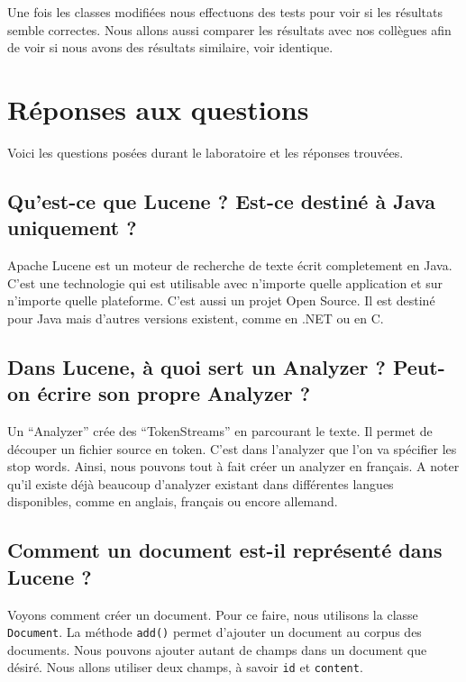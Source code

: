 \documentclass[a4paper, 11pt]{article}
\begin{document}
{Une fois les classes modifiées nous effectuons des tests pour voir si les résultats semble correctes. Nous allons aussi comparer les résultats avec nos collègues afin de voir si nous avons des résultats similaire, voir identique.

\section{Réponses aux questions} 

Voici les questions posées durant le laboratoire et les réponses trouvées. 

\subsection{Qu’est-ce que Lucene ? Est-ce destiné à Java uniquement ?}

Apache Lucene est un moteur de recherche de texte écrit completement en Java. C'est une technologie qui est utilisable avec n'importe quelle application et sur n'importe quelle plateforme.
C'est aussi un projet Open Source. Il est destiné pour Java mais d'autres versions existent, comme en .NET ou en C.

\subsection{Dans Lucene, à quoi sert un Analyzer ? Peut-on écrire son propre Analyzer ?}
Un “Analyzer” crée des “TokenStreams” en parcourant le texte. Il permet de découper un fichier source en token. C'est dans l'analyzer que l'on va spécifier les stop words. Ainsi, nous pouvons tout à fait créer un analyzer en français. A noter qu'il existe déjà beaucoup d'analyzer existant dans différentes langues disponibles, comme en anglais, français ou encore allemand. 
   
\subsection{Comment un document est-il représenté dans Lucene ?}
Voyons comment créer un document. Pour ce faire, nous utilisons la classe \texttt{Document}. La méthode \texttt{add()} permet d'ajouter un document au corpus des documents. Nous pouvons ajouter autant de champs dans un document que désiré. Nous allons utiliser deux champs, à savoir \texttt{id} et \texttt{content}. 

}
\end{document}
